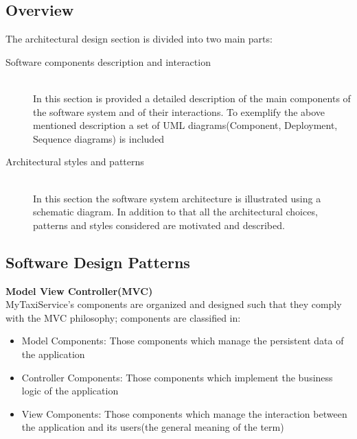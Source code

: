 \documentclass[11pt,titlepage]{article} %
\begin{document}
\subsection{Overview}
         The architectural design section is divided into two main parts:
	\begin{description}
	        \item [Software components description and interaction] \hfill \\
	            In this section is provided a detailed description of the main components of the software system
	            and of their interactions.
	            To exemplify the above mentioned description a set of UML diagrams(Component, Deployment, Sequence diagrams) is
	            included
	        \item [Architectural styles and patterns] \hfill \\
	            In this section the software system architecture is illustrated using a schematic diagram.
	            In addition to that all the architectural choices, patterns and styles considered are motivated and described.
	\end{description}

\subsection{Software Design Patterns}
	\textbf{Model View Controller(MVC)} \hfill \\
		MyTaxiService's components are organized and designed  such that they comply with the  MVC philosophy; \newline
		components are classified in:
		\begin{itemize}
			\item Model Components: Those components which manage the persistent data of the application
			\item Controller Components: Those components which implement the business logic of the application
			\item View Components: Those components which manage the interaction between the application and its users(the general meaning of the term)
		\end{itemize}
\newpage
\end{document}
